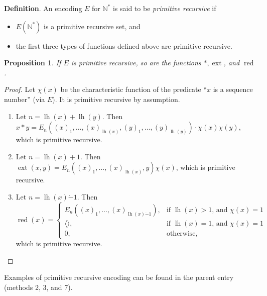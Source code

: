 \documentclass[12pt]{article}
\newtheorem{prop}{Proposition}
\begin{document}
\textbf{Definition}.  An encoding $E$ for $\mathbb{N}^*$ is said to be \emph{primitive recursive} if 
\begin{itemize}
\item $E(\mathbb{N}^*)$ is a primitive recursive set, and
\item the first three types of functions defined above are primitive recursive.
\end{itemize}

\begin{prop} If $E$ is primitive recursive, so are the functions $*,\operatorname{ext}$, and $\operatorname{red}$. \end{prop}
\begin{proof}  Let $\chi(x)$ be the characteristic function of the predicate ``$x$ is a sequence number'' (via $E$).  It is primitive recursive by assumption.
\begin{enumerate}
\item Let $n= \operatorname{lh}(x)+\operatorname{lh}(y)$.  Then $x* y = E_n((x)_1, \ldots, (x)_{\operatorname{lh}(x)}, (y)_1, \ldots, (y)_{\operatorname{lh}(y)})\cdot \chi(x)\chi(y)$, which is primitive recursive.
\item Let $n= \operatorname{lh}(x)+1$.  Then $\operatorname{ext}(x,y) = E_n((x)_1, \ldots, (x)_{\operatorname{lh}(x)}, y)\chi(x)$, which is primitive recursive.
\item Let $n= \operatorname{lh}(x)\dot{-}1$.  Then 
\begin{displaymath}
\operatorname{red}(x) = \left\{
\begin{array}{ll}
E_n((x)_1, \ldots, (x)_{\operatorname{lh}(x)\dot{-} 1}) , & \textrm{if }\operatorname{lh}(x)>1\textrm{, and }\chi(x)=1 \\
\langle \rangle, & \textrm{if }\operatorname{lh}(x)=1\textrm{, and }\chi(x)=1 \\
0 , & \textrm{otherwise},
\end{array}
\right.
\end{displaymath}
which is primitive recursive.
\end{enumerate}
\end{proof}

Examples of primitive recursive encoding can be found in the parent entry (methods 2, 3, and 7).
\end{document}
